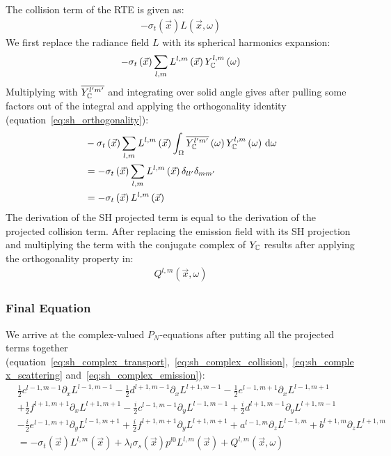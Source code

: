 The collision term of the RTE is given as:
\begin{align*}
-\sigma_t\left(\vec{x}\right)L\left(\vec{x}, \omega\right)
\end{align*}
We first replace the radiance field $L$ with its spherical harmonics expansion:
\begin{align*}
-\sigma_t\left(\vec{x}\right)
\sum_{l,m}
{
L^{l,m}\left(\vec{x}\right )Y_{\mathbb{C}}^{l,m}\left(\omega\right)
}
\end{align*}
Multiplying with $\overline{Y_{\mathbb{C}}^{l'm'}}$ and integrating over solid angle gives after pulling some factors out of the integral and applying the orthogonality identity (equation~\ref{eq:sh_orthogonality}):
\begin{align}
&-\sigma_t\left(\vec{x}\right)\sum_{l,m}{L^{l,m}\left(\vec{x}\right )\int_\Omega\overline{Y_{\mathbb{C}}^{l'm'}}\left(\omega\right)Y_{\mathbb{C}}^{l,m}\left(\omega\right)\,\mathrm{d}\omega}
\nonumber
\\
&= -\sigma_t\left(\vec{x}\right)\sum_{l,m}{L^{l,m}\left(\vec{x}\right )\delta_{ll'}\delta_{mm'}}
\nonumber
\\
&= -\sigma_t\left(\vec{x}\right)L^{l,m}\left(\vec{x}\right )
\label{eq:sh_complex_collision}
\end{align}
The derivation of the SH projected term is equal to the derivation of the projected collision term. After replacing the emission field with its SH projection and multiplying the term with the conjugate complex of $Y_{\mathbb{C}}$ results after applying the orthogonality property in:
\begin{align}
Q^{l,m}\left(\vec{x}, \omega\right)
\label{eq:sh_complex_emission}
\end{align}


\subsubsection*{Final Equation}

We arrive at the complex-valued $P_N$-equations after putting all the projected terms together (equation~\ref{eq:sh_complex_transport},~\ref{eq:sh_complex_collision},~\ref{eq:sh_complex_scattering} and~\ref{eq:sh_complex_emission}):
\begin{align}
&
\frac{1}{2}c^{l-1, m-1}\partial_x L^{l-1,m-1}
-\frac{1}{2}d^{l+1, m-1}\partial_x L^{l+1,m-1}
-\frac{1}{2}e^{l-1, m+1}\partial_x L^{l-1,m+1}
\nonumber
\\
&
+\frac{1}{2}f^{l+1, m+1}\partial_x L^{l+1,m+1}
-\frac{i}{2}c^{l-1, m-1}\partial_y L^{l-1,m-1}
+\frac{i}{2}d^{l+1, m-1}\partial_y L^{l+1,m-1}
\nonumber
\\
&
-\frac{i}{2}e^{l-1, m+1}\partial_y L^{l-1,m+1}
+\frac{i}{2}f^{l+1, m+1}\partial_y L^{l+1,m+1}
+a^{l-1, m}\partial_z L^{l-1,m}
+b^{l+1, m}\partial_z L^{l+1,m}
\nonumber
\\
&
=
-\sigma_t\left(\vec{x}\right)L^{l,m}\left(\vec{x}\right )
+
\lambda_l
\sigma_s(\vec{x})
p^{l0}L^{l,m}(\vec{x}) + Q^{l,m}\left(\vec{x}, \omega\right)
\label{eq:sh_pne_complex}
\end{align}